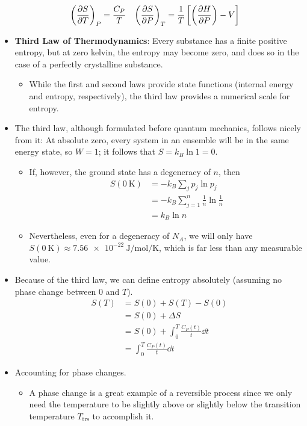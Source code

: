 \documentclass[../notes.tex]{subfiles}
\begin{document}
\begin{itemize}
\begin{align*}
        \left( \pdv{S}{T} \right)_P &= \frac{C_P}{T}&
        \left( \pdv{S}{P} \right)_T &= \frac{1}{T}\left[ \left( \pdv{H}{P} \right)-V \right]
    \end{align*}
    \item \textbf{Third Law of Thermodynamics}: Every substance has a finite positive entropy, but at zero kelvin, the entropy may become zero, and does so in the case of a perfectly crystalline substance.
    \begin{itemize}
        \item While the first and second laws provide state functions (internal energy and entropy, respectively), the third law provides a numerical scale for entropy.
    \end{itemize}
    \item The third law, although formulated before quantum mechanics, follows nicely from it: At absolute zero, every system in an ensemble will be in the same energy state, so $W=1$; it follows that $S=k_B\ln 1=0$.
    \begin{itemize}
        \item If, however, the ground state has a degeneracy of $n$, then
        \begin{align*}
            S(\SI{0}{\kelvin}) &= -k_B\sum_jp_j\ln p_j\\
            &= -k_B\sum_{j=1}^n\frac{1}{n}\ln\frac{1}{n}\\
            &= k_B\ln n
        \end{align*}
        \item Nevertheless, even for a degeneracy of $N_A$, we will only have $S(\SI{0}{\kelvin})\approx\SI{7.56e-22}{\joule\per\mole\per\kelvin}$, which is far less than any measurable value.
    \end{itemize}
    \item Because of the third law, we can define entropy absolutely (assuming no phase change between 0 and $T$).
    \begin{align*}
        S(T) &= S(0)+S(T)-S(0)\\
        &= S(0)+\Delta S\\
        &= S(0)+\int_0^T\frac{C_P(t)}{t}\dd{t}\\
        &= \int_0^T\frac{C_P(t)}{t}\dd{t}
    \end{align*}
    \item Accounting for phase changes.
    \begin{itemize}
        \item A phase change is a great example of a reversible process since we only need the temperature to be slightly above or slightly below the transition temperature $T_\text{trs}$ to accomplish it.

\end{itemize}
\end{itemize}
\end{document}
